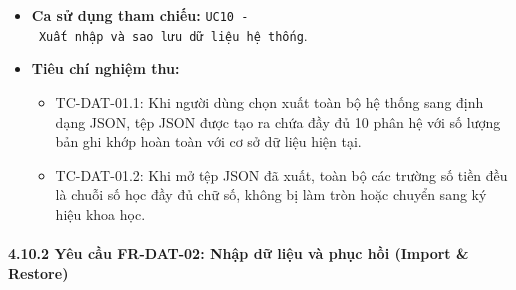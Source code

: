 \documentclass[11pt,a4paper]{article}
\providecommand{\tightlist}{
  \setlength{\itemsep}{0pt}\setlength{\parskip}{0pt}}
\begin{document}
\begin{itemize}
  \begin{itemize}
  \tightlist
  \item
    Tệp dữ liệu được tạo thành công tại đường dẫn chỉ định.
  \item
    Thông báo xuất dữ liệu thành công kèm thông tin về đường dẫn tệp,
    kích thước tệp và số lượng bản ghi đã xuất.
  \end{itemize}
\item
  \textbf{Ca sử dụng tham chiếu:}
  \texttt{UC10\ -\ Xuất\ nhập\ và\ sao\ lưu\ dữ\ liệu\ hệ\ thống}.
\item
  \textbf{Tiêu chí nghiệm thu:}

  \begin{itemize}
  \tightlist
  \item
    TC-DAT-01.1: Khi người dùng chọn xuất toàn bộ hệ thống sang định
    dạng JSON, tệp JSON được tạo ra chứa đầy đủ 10 phân hệ với số lượng
    bản ghi khớp hoàn toàn với cơ sở dữ liệu hiện tại.
  \item
    TC-DAT-01.2: Khi mở tệp JSON đã xuất, toàn bộ các trường số tiền đều
    là chuỗi số học đầy đủ chữ số, không bị làm tròn hoặc chuyển sang ký
    hiệu khoa học.
  \end{itemize}
\end{itemize}

\paragraph{4.10.2 Yêu cầu FR-DAT-02: Nhập dữ liệu và phục hồi (Import \&
Restore)}\label{4102-yuxeau-cux1ea7u-fr-dat-02-nhux1eadp-dux1eef-liux1ec7u-vuxe0-phux1ee5c-hux1ed3i-import--restore}
\end{document}
